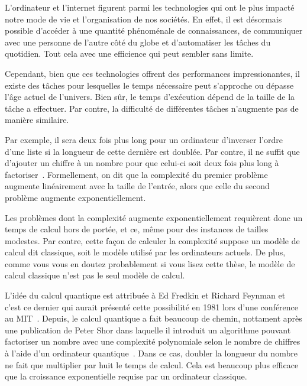 \begin{comment}
\end{comment}

\Introduction   %

L'ordinateur et l'internet figurent parmi les technologies qui ont le plus impacté
notre mode de vie et l'organisation de nos sociétés.
En effet,
il est désormais possible d'accéder à une quantité phénoménale de connaissances,
de communiquer avec une personne de l'autre côté du globe
et d'automatiser les tâches du quotidien.
Tout cela avec une efficience qui peut sembler sans limite.

Cependant, 
bien que ces technologies offrent des performances impressionantes,
il existe des tâches pour lesquelles le temps nécessaire peut s'approche ou
dépasse l'âge actuel de l'univers.
Bien sûr,
le temps d'exécution dépend de la taille de la tâche a effectuer.
Par contre, 
la difficulté de différentes tâches n'augmente pas de manière similaire.

Par exemple,
il sera deux fois plus long pour un ordinateur d'inverser l'ordre d'une liste 
si la longueur de cette dernière est doublée.
Par contre,
il ne suffit que d'ajouter un chiffre à un nombre pour que celui-ci soit deux 
fois plus long à factoriser~\cite{arora_computational_2009}.
Formellement,
on dit que la complexité du premier problème augmente linéairement avec la taille de l'entrée,
alors que celle du second problème augmente exponentiellement.

Les problèmes dont la complexité augmente exponentiellement requièrent donc un temps de calcul
hors de portée, et ce, même pour des instances de tailles modestes.
Par contre,
cette façon de calculer la complexité suppose un modèle de calcul dit classique,
soit le modèle utilisé par les ordinateurs actuels.
De plus,
comme vous vous en doutez probablement si vous lisez cette thèse,
le modèle de calcul classique n'est pas le seul modèle de calcul.

L'idée du calcul quantique est attribuée à Ed Fredkin et Richard Feynman et 
c'est ce dernier qui aurait présenté cette possibilité en 1981 lors d'une conférence au MIT~\cite{hoofnagle_birth_2021}.
Depuis,
le calcul quantique a fait beaucoup de chemin,
nottament après une publication de Peter Shor dans laquelle il introduit un 
algorithme pouvant factoriser un nombre avec une complexité polynomiale selon
le nombre de chiffres à l'aide d'un ordinateur quantique~\cite{shor_algorithms_1994}.
Dans ce cas,
doubler la longueur du nombre ne fait que multiplier par huit le temps de calcul.
Cela est beaucoup plus efficace que la croissance exponentielle requise par un ordinateur classique.

